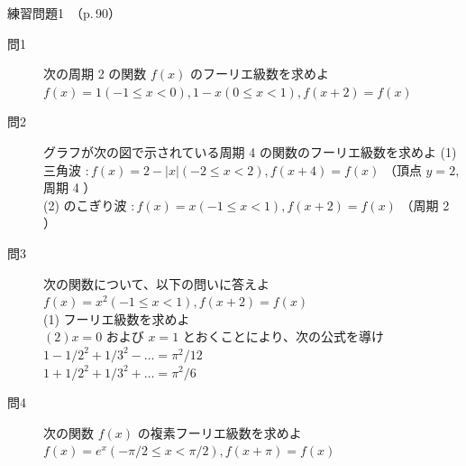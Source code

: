 \documentclass[aspectratio=43,professionalfonts,handout]{beamer}
\begin{document}
\begin{frame}{練習問題1　（p.\,90）}
  \begin{block}{}
  \begin{description}
    \item[問1] 次の周期 2 の関数 $f(x)$ のフーリエ級数を求めよ
    $f(x) = { 1  (-1 \leq x < 0),  1-x  (0 \leq x < 1) },  f(x+2) = f(x)$\\
    \item[問2] グラフが次の図で示されている周期 4 の関数のフーリエ級数を求めよ
    (1) 三角波 $: f(x) = 2 - |x| (-2 \leq x < 2), f(x+4) = f(x)$ （頂点 $y=2,$ 周期 4 ）\\
    (2) のこぎり波 $: f(x) = x (-1 \leq x < 1), f(x+2) = f(x)$ （周期 2 ）\\
    \item[問3] 次の関数について、以下の問いに答えよ
    $f(x) = x^{2}  (-1 \leq x < 1),  f(x+2) = f(x)$\\
    (1) フーリエ級数を求めよ\\
    $(2) x=0$ および $x=1$ とおくことにより、次の公式を導け\\
    $1 - 1/2^{2} + 1/3^{2} - \ldots = \pi^{2}/12$\\
    $1 + 1/2^{2} + 1/3^{2} + \ldots = \pi^{2}/6$\\
    \item[問4] 次の関数 $f(x)$ の複素フーリエ級数を求めよ
    $f(x) = e^x  (-\pi/2 \leq x < \pi/2),  f(x+\pi) = f(x)$\\
  \end{description}
  \end{block}
\end{frame}
\end{document}
